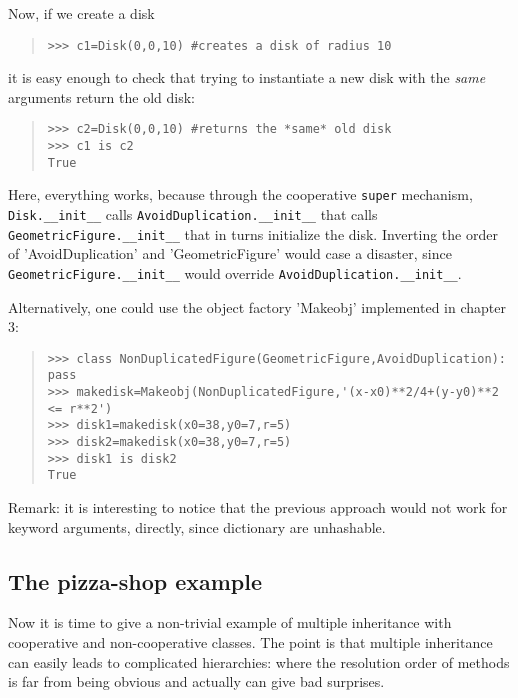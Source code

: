 \documentclass[10pt,english]{article}
\begin{document}
Now, if we create a disk
\begin{quote}
\begin{verbatim}>>> c1=Disk(0,0,10) #creates a disk of radius 10\end{verbatim}
\end{quote}

it is easy enough to check that trying to instantiate a new disk with the
\emph{same} arguments return the old disk:
\begin{quote}
\begin{verbatim}>>> c2=Disk(0,0,10) #returns the *same* old disk
>>> c1 is c2
True\end{verbatim}
\end{quote}

Here, everything works, because through the 
cooperative \texttt{super} mechanism, \texttt{Disk.{\_}{\_}init{\_}{\_}} calls 
\texttt{AvoidDuplication.{\_}{\_}init{\_}{\_}} that calls \texttt{GeometricFigure.{\_}{\_}init{\_}{\_}} 
that in turns initialize the disk. Inverting the order of
'AvoidDuplication' and 'GeometricFigure' would case a disaster, since
\texttt{GeometricFigure.{\_}{\_}init{\_}{\_}} would override \texttt{AvoidDuplication.{\_}{\_}init{\_}{\_}}.

Alternatively, one could use the object factory 'Makeobj' implemented in 
chapter 3:
\begin{quote}
\begin{verbatim}>>> class NonDuplicatedFigure(GeometricFigure,AvoidDuplication): pass
>>> makedisk=Makeobj(NonDuplicatedFigure,'(x-x0)**2/4+(y-y0)**2 <= r**2')
>>> disk1=makedisk(x0=38,y0=7,r=5)
>>> disk2=makedisk(x0=38,y0=7,r=5)
>>> disk1 is disk2
True\end{verbatim}
\end{quote}

Remark: it is interesting to notice that the previous approach would not work
for keyword arguments, directly, since dictionary are unhashable.



\hypertarget{the-pizza-shop-example}{}
\subsection*{The pizza-shop example}

Now it is time to give a non-trivial example of multiple inheritance with
cooperative and non-cooperative classes. The point is that multiple 
inheritance can easily leads to complicated hierarchies: where the
resolution order of methods is far from being obvious and actually
can give bad surprises.
\end{document}
